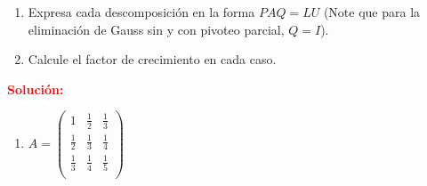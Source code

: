 \begin{enumerate}[]
    \item Expresa cada descomposición en la forma $PAQ = LU$ (Note que para la eliminación de Gauss sin y con pivoteo parcial, $Q=I$).
    
    \item Calcule el factor de crecimiento en cada caso.
\end{enumerate}

\noindent \textcolor{red}{\bf Solución:}\\    
\begin{enumerate}[]
    \item 
    $A = \begin{pmatrix}
            1 & \frac{1}{2} & \frac{1}{3} \\ 
            \frac{1}{2} & \frac{1}{3} & \frac{1}{4} \\
            \frac{1}{3} & \frac{1}{4} & \frac{1}{5} \\
        \end{pmatrix}$
    

\end{enumerate}
